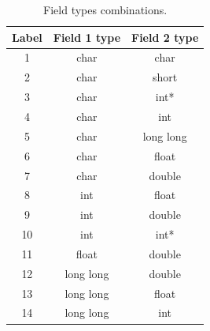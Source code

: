 \begin{table}[htb]
\centering
\begin{tabular}{ccc}
\toprule
Label & Field 1 type & Field 2 type \\
\midrule
1 & char & char \\
2 & char & short \\
3 & char & int* \\
4 & char & int \\
5 & char & long long \\
6 & char & float \\
7 & char & double \\
8 & int & float \\
9 & int & double \\
10 & int & int* \\
11 & float & double \\
12 & long long & double \\
13 & long long & float \\
14 & long long & int \\
\bottomrule
\end{tabular}
\caption{Field types combinations.}
\label{tbl:field-combinations}
\end{table}


